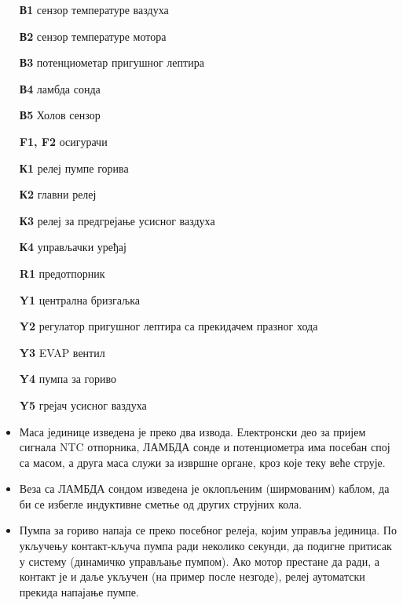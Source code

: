 \documentclass[12pt]{article}
\begin{document}
\begin{itemize}[leftmargin=1.6cm, labelwidth=0.7 cm, labelsep=0.3cm, align=left, itemsep=0pt]
    \item[\textbf{В1}] сензор температуре ваздуха
    \item[\textbf{В2}] сензор температуре мотора
    \item[\textbf{В3}] потенциометар пригушног лептира
    \item[\textbf{В4}] ламбда сонда
    \item[\textbf{В5}] Холов сензор
    \item[\textbf{F1, F2}] осигурачи
    \item[\textbf{К1}] релеј пумпе горива
    \item[\textbf{К2}] главни релеј
    \item[\textbf{К3}] релеј за предгрејање усисног ваздуха
    \item[\textbf{К4}] управљачки уређај
    \item[\textbf{R1}] предотпорник
    \item[\textbf{Y1}] централна бризгаљка
    \item[\textbf{Y2}] регулатор пригушног лептира са прекидачем празног хода
    \item[\textbf{Y3}] EVAP вентил
    \item[\textbf{Y4}] пумпа за гориво
    \item[\textbf{Y5}] грејач усисног ваздуха
\end{itemize}

\begin{kljucno}
      \begin{itemize}
    \item Маса јединице изведена је преко два извода. Електронски део за пријем
          сигнала NTC отпорника, ЛАМБДА сонде и потенциометра има посебан спој
          са масом, а друга маса служи за извршне органе, кроз које теку веће
          струје.
    \item Веза са ЛАМБДА сондом изведена је оклопљеним (ширмованим) каблом,
          да би се избегле индуктивне сметње од других струјних кола.
    \item Пумпа за гориво напаја се преко посебног релеја, којим управља
          јединица. По укључењу контакт-кључа пумпа ради неколико секунди, да
          подигне притисак у систему (динамичко управљање пумпом). Ако мотор
          престане да ради, а контакт је и даље укључен (на пример после
          незгоде), релеј аутоматски прекида напајање пумпе.
\end{itemize}
\end{kljucno}
\end{document}
